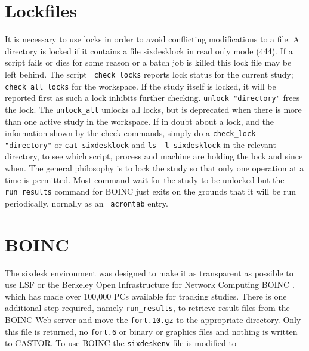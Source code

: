 \documentclass{cernatsnote}
\begin{document}
\section{Lockfiles} It is necessary to use locks in order to avoid conflicting
modifications to a file. A directory is locked if it contains a file
sixdesklock in read only mode (444).  If a script fails or dies for some reason
or a batch job is killed this lock file may be left behind. The script {\tt
check\_locks} reports lock status for the current study; {\tt
check\_all\_locks} for the workspace. If the study itself is locked, it will be
reported first as such a lock inhibits further checking.  {\tt unlock
"directory"} frees the lock. The \texttt{unlock\_all} unlocks all locks, but is
deprecated when there is more than one active study in the workspace. If in
doubt about a lock, and the information shown by the check commands, simply do
a \texttt{check\_lock "directory"} or \texttt{cat sixdesklock} and {\tt ls -l
sixdesklock} in the relevant directory, to see which script, process and
machine are holding the lock and since when. The general philosophy is to lock
the study so that only one operation at a time is permitted. Most command wait
for the study to be unlocked but the \texttt{run\_results} command for BOINC just
exits on the grounds that it will be run periodically, nornally as an {\tt
acrontab} entry.

\section{BOINC}
The sixdesk environment was designed to make it as transparent as possible to
use LSF or the 
Berkeley Open Infrastructure for Network Computing BOINC \cite{Boinc}.
which has made over 100,000 PCs available for tracking studies.
There is one additional step required, namely \texttt{run\_results}, to
retrieve result files from the BOINC Web server 
and move the \texttt{fort.10.gz} to the appropriate directory.
Only this file is returned, no \texttt{fort.6} or binary
or graphics files and nothing is written to CASTOR.
To use BOINC the \texttt{sixdeskenv} file is modified to
\end{document}
